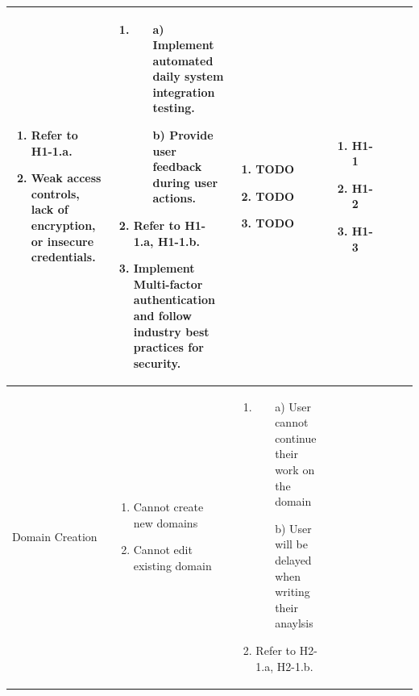 \documentclass{article}
\begin{document}
\begin{landscape}
\begin{longtable}{|p{3cm}|p{3cm}|p{4cm}|p{4cm}|p{3cm}|p{2cm}|p{3cm}|}
\begin{enumerate}[leftmargin=*]
    \item Refer to H1-1.a.
    \item Weak access controls, lack of encryption, or insecure credentials.
  \end{enumerate} &
  \begin{enumerate}[leftmargin=*]
    \item 
    \begin{enumerate}
        \item[a)] Implement automated daily system integration testing.
        \item[b)] Provide user feedback during user actions.
    \end{enumerate}
    \item Refer to H1-1.a, H1-1.b.
    \item Implement Multi-factor authentication and follow industry best practices for security.
  \end{enumerate} &
  \begin{enumerate}[leftmargin=*]
    \item TODO
    \item TODO
    \item TODO
  \end{enumerate} &
  \begin{enumerate}[leftmargin=*]
    \item H1-1
    \item H1-2
    \item H1-3
  \end{enumerate} \\
  \hline
    Domain Creation & 
  \begin{enumerate}[leftmargin=*]
      \item Cannot create new domains
      \item Cannot edit existing domain
  \end{enumerate} & 
  \begin{enumerate}[leftmargin=*]
    \item
    \begin{enumerate}
        \item[a)] User cannot continue their work on the domain
        \item[b)] User will be delayed when writing their anaylsis
    \end{enumerate}
    \item Refer to H2-1.a, H2-1.b.
  \end{enumerate} &
  \begin{enumerate}[leftmargin=*]

\end{enumerate}
\end{longtable}
\end{landscape}
\end{document}
